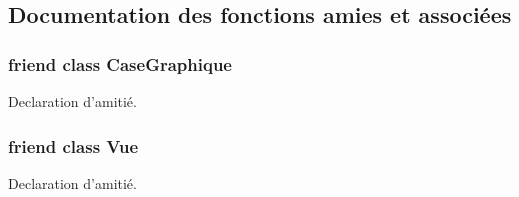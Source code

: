 \subsection{Documentation des fonctions amies et associées}
\hypertarget{classgrenouilloland_1_1GrenouillolandGraphique_ac12b0ba9ebe667c8408ac35bf21598e8}{
\subsubsection[{Case\-Graphique}]{\setlength{\rightskip}{0pt plus 5cm}friend class {\bf Case\-Graphique}\hspace{0.3cm}{\ttfamily [friend]}}}\label{classgrenouilloland_1_1GrenouillolandGraphique_ac12b0ba9ebe667c8408ac35bf21598e8}
Declaration d'amitié. \hypertarget{classgrenouilloland_1_1GrenouillolandGraphique_adc3b1810b8d3988a7832f57c330fe4fd}{
\subsubsection[{Vue}]{\setlength{\rightskip}{0pt plus 5cm}friend class {\bf Vue}\hspace{0.3cm}{\ttfamily [friend]}}}\label{classgrenouilloland_1_1GrenouillolandGraphique_adc3b1810b8d3988a7832f57c330fe4fd}
Declaration d'amitié. 

